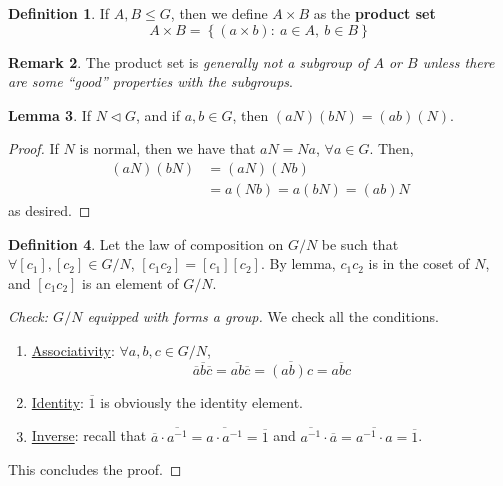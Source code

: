 \documentclass[11pt]{amsart} %
\theoremstyle{definition}
\newtheorem{definition}{Definition}[section]
\newtheorem{lemma}[definition]{Lemma}
\theoremstyle{definition}
\newtheorem{remark}[definition]{Remark}
\numberwithin{equation}{section}
\newcommand{\condset}[4]{\left\{ #1  : \: #2 #3 #4 \right\}}
\newcommand{\qgroup}[2]{#1 / #2}
\begin{document}
\begin{definition}
	If $A,B \leq G$, then we define $A \times B$ as the \textbf{product set}
	$$A \times B = \condset{(a \times b)}{a \in A, \: }{ b\in B}{} $$
\end{definition}

\begin{remark}
	The product set is \textit{generally not a subgroup of $A$ or $B$ unless there are some ``good'' properties with the subgroups}.
\end{remark}

\begin{lemma}
	If $N \lhd G$, and if $a,b \in G$, then $(aN)(bN) = (ab)(N)$.
\end{lemma}

\begin{proof}
	If $N$ is normal, then we have that $aN=Na$, $\forall a \in G$. Then,
	\begin{align*}
	(aN)(bN) &= (aN)(Nb) \\
	&= a (Nb) = a (bN) = (ab)N
	\end{align*}
	as desired.
\end{proof}

\begin{definition}
	\label{deflawofcompositionquotientgroup}
	Let the law of composition on $\qgroup{G}{N}$ be such that $\forall [c_1], [c_2] \in \qgroup{G}{N}$, $[c_1 c_2] = [c_1][c_2]$. By lemma, $c_1 c_2$ is in the coset of $N$, and $[c_1 c_2] $ is an element of $\qgroup{G}{N}$.
\end{definition}

\begin{proof}[Check: $\qgroup{G}{N}$ equipped with  forms a group]
	We check all the conditions.
	\begin{enumerate}%
		\item \uline{Associativity}: $\forall a,b,c \in \qgroup{G}{N}$,
		$$\overline{a} \overline{b} \overline{c} = \overline{ab} \overline{c} = \overline{(ab)c } = \overline{abc}$$
		
		\item \uline{Identity}: $\overline{1}$ is obviously the identity element.
		
		\item \uline{Inverse}: recall that $ \overline{a} \cdot \overline{a^{-1}} = \overline{a\cdot a^{-1}} = \overline{1}$ and $ \overline{a^{-1}} \cdot \overline{a} = \overline{a^{-1} \cdot a} = \overline{1}$.
	\end{enumerate}
This concludes the proof. 
\end{proof}
\end{document}
